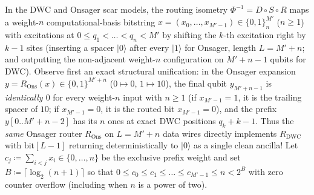 \documentclass[11pt,a4paper]{article}
\theoremstyle{remark}
\newcommand{\ket}[1]{\lvert #1 \rangle}
\begin{document}
In the DWC and Onsager scar models, the routing isometry $\Phi^{-1} = D \circ S \circ R$ maps a weight-$n$ computational-basis bitstring $x = (x_0, \dots, x_{M'-1}) \in \{0,1\}^{M'}_n$ ($n \ge 1$) with excitations at $0 \le q_1 < \dots < q_n < M'$ by shifting the $k$-th excitation right by $k - 1$ sites (inserting a spacer $\ket{0}$ after every $\ket{1}$ for Onsager, length $L = M' + n$; and outputting the non-adjacent weight-$n$ configuration on $M' + n - 1$ qubits for DWC). Observe first an exact structural unification: in the Onsager expansion $y = R_{\mathrm{Ons}}(x) \in \{0,1\}^{M'+n}$ ($0 \mapsto 0$, $1 \mapsto 10$), the final qubit $y_{M'+n-1}$ is \emph{identically $0$} for every weight-$n$ input with $n \ge 1$ (if $x_{M'-1} = 1$, it is the trailing spacer of $10$; if $x_{M'-1} = 0$, it is the routed bit $x_{M'-1} = 0$), and the prefix $y[0..M'+n-2]$ has its $n$ ones at exact DWC positions $q_k + k - 1$. Thus the \emph{same} Onsager router $R_{\mathrm{Ons}}$ on $L = M' + n$ data wires directly implements $R_{\mathrm{DWC}}$ with $\mathrm{bit}[L-1]$ returning deterministically to $\ket{0}$ as a single clean ancilla! Let $c_j \coloneqq \sum_{i < j} x_i \in \{0, \dots, n\}$ be the exclusive prefix weight and set $B \coloneqq \lceil \log_2(n + 1) \rceil$ so that $0 \le c_0 \le c_1 \le \dots \le c_{M'-1} \le n < 2^B$ with zero counter overflow (including when $n$ is a power of two).
\end{document}
